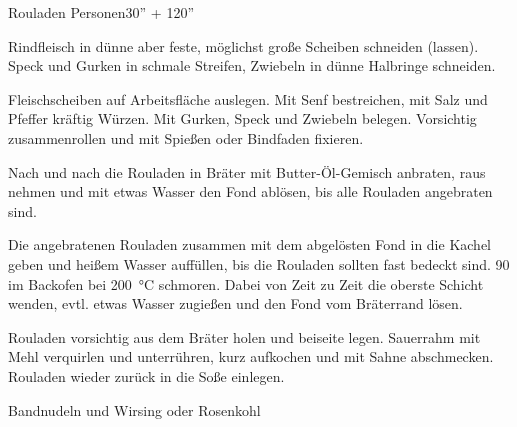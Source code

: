 \begin{MyRecipe}{Rouladen}{ Personen}{30'' + 120''}


Rindfleisch in dünne aber feste, möglichst große Scheiben schneiden (lassen).\\
Speck und Gurken in schmale Streifen, Zwiebeln in dünne Halbringe schneiden.\par\bigskip


Fleischscheiben auf Arbeitsfläche auslegen. Mit Senf bestreichen, mit Salz und Pfeffer kräftig Würzen. Mit Gurken, Speck und Zwiebeln belegen. Vorsichtig zusammenrollen und mit Spießen oder Bindfaden fixieren.\par
Nach und nach die Rouladen in Bräter mit Butter-Öl-Gemisch anbraten, raus nehmen und mit etwas Wasser den Fond ablösen, bis alle Rouladen angebraten sind.\par
Die angebratenen Rouladen zusammen mit dem abgelösten Fond in die Kachel geben und heißem Wasser auffüllen, bis die Rouladen sollten fast bedeckt sind. \SI{90}{\min} im Backofen bei \SI{200}{\degreeCelsius} schmoren. Dabei von Zeit zu Zeit die oberste Schicht wenden, evtl. etwas Wasser zugießen und den Fond vom Bräterrand lösen.\par\bigskip


Rouladen vorsichtig aus dem Bräter holen und beiseite legen. Sauerrahm mit Mehl verquirlen und unterrühren, kurz aufkochen und mit Sahne abschmecken. Rouladen wieder zurück in die Soße einlegen.\par\bigskip


Bandnudeln und Wirsing oder Rosenkohl

\end{MyRecipe}